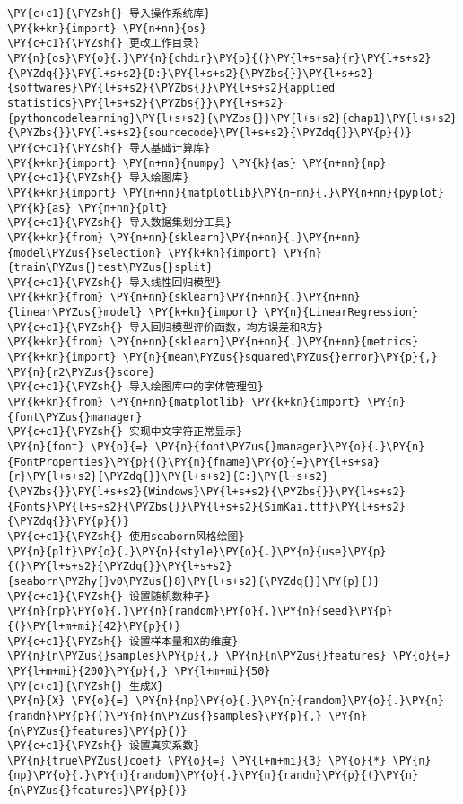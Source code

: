 \begin{Verbatim}[commandchars=\\\{\}]
\PY{c+c1}{\PYZsh{} 导入操作系统库}
\PY{k+kn}{import} \PY{n+nn}{os}
\PY{c+c1}{\PYZsh{} 更改工作目录}
\PY{n}{os}\PY{o}{.}\PY{n}{chdir}\PY{p}{(}\PY{l+s+sa}{r}\PY{l+s+s2}{\PYZdq{}}\PY{l+s+s2}{D:}\PY{l+s+s2}{\PYZbs{}}\PY{l+s+s2}{softwares}\PY{l+s+s2}{\PYZbs{}}\PY{l+s+s2}{applied statistics}\PY{l+s+s2}{\PYZbs{}}\PY{l+s+s2}{pythoncodelearning}\PY{l+s+s2}{\PYZbs{}}\PY{l+s+s2}{chap1}\PY{l+s+s2}{\PYZbs{}}\PY{l+s+s2}{sourcecode}\PY{l+s+s2}{\PYZdq{}}\PY{p}{)}
\PY{c+c1}{\PYZsh{} 导入基础计算库}
\PY{k+kn}{import} \PY{n+nn}{numpy} \PY{k}{as} \PY{n+nn}{np}
\PY{c+c1}{\PYZsh{} 导入绘图库}
\PY{k+kn}{import} \PY{n+nn}{matplotlib}\PY{n+nn}{.}\PY{n+nn}{pyplot} \PY{k}{as} \PY{n+nn}{plt}
\PY{c+c1}{\PYZsh{} 导入数据集划分工具}
\PY{k+kn}{from} \PY{n+nn}{sklearn}\PY{n+nn}{.}\PY{n+nn}{model\PYZus{}selection} \PY{k+kn}{import} \PY{n}{train\PYZus{}test\PYZus{}split}
\PY{c+c1}{\PYZsh{} 导入线性回归模型}
\PY{k+kn}{from} \PY{n+nn}{sklearn}\PY{n+nn}{.}\PY{n+nn}{linear\PYZus{}model} \PY{k+kn}{import} \PY{n}{LinearRegression}
\PY{c+c1}{\PYZsh{} 导入回归模型评价函数，均方误差和R方}
\PY{k+kn}{from} \PY{n+nn}{sklearn}\PY{n+nn}{.}\PY{n+nn}{metrics} \PY{k+kn}{import} \PY{n}{mean\PYZus{}squared\PYZus{}error}\PY{p}{,} \PY{n}{r2\PYZus{}score}
\PY{c+c1}{\PYZsh{} 导入绘图库中的字体管理包}
\PY{k+kn}{from} \PY{n+nn}{matplotlib} \PY{k+kn}{import} \PY{n}{font\PYZus{}manager}
\PY{c+c1}{\PYZsh{} 实现中文字符正常显示}
\PY{n}{font} \PY{o}{=} \PY{n}{font\PYZus{}manager}\PY{o}{.}\PY{n}{FontProperties}\PY{p}{(}\PY{n}{fname}\PY{o}{=}\PY{l+s+sa}{r}\PY{l+s+s2}{\PYZdq{}}\PY{l+s+s2}{C:}\PY{l+s+s2}{\PYZbs{}}\PY{l+s+s2}{Windows}\PY{l+s+s2}{\PYZbs{}}\PY{l+s+s2}{Fonts}\PY{l+s+s2}{\PYZbs{}}\PY{l+s+s2}{SimKai.ttf}\PY{l+s+s2}{\PYZdq{}}\PY{p}{)}
\PY{c+c1}{\PYZsh{} 使用seaborn风格绘图}
\PY{n}{plt}\PY{o}{.}\PY{n}{style}\PY{o}{.}\PY{n}{use}\PY{p}{(}\PY{l+s+s2}{\PYZdq{}}\PY{l+s+s2}{seaborn\PYZhy{}v0\PYZus{}8}\PY{l+s+s2}{\PYZdq{}}\PY{p}{)}
\PY{c+c1}{\PYZsh{} 设置随机数种子}
\PY{n}{np}\PY{o}{.}\PY{n}{random}\PY{o}{.}\PY{n}{seed}\PY{p}{(}\PY{l+m+mi}{42}\PY{p}{)}
\PY{c+c1}{\PYZsh{} 设置样本量和X的维度}
\PY{n}{n\PYZus{}samples}\PY{p}{,} \PY{n}{n\PYZus{}features} \PY{o}{=} \PY{l+m+mi}{200}\PY{p}{,} \PY{l+m+mi}{50}
\PY{c+c1}{\PYZsh{} 生成X}
\PY{n}{X} \PY{o}{=} \PY{n}{np}\PY{o}{.}\PY{n}{random}\PY{o}{.}\PY{n}{randn}\PY{p}{(}\PY{n}{n\PYZus{}samples}\PY{p}{,} \PY{n}{n\PYZus{}features}\PY{p}{)}
\PY{c+c1}{\PYZsh{} 设置真实系数}
\PY{n}{true\PYZus{}coef} \PY{o}{=} \PY{l+m+mi}{3} \PY{o}{*} \PY{n}{np}\PY{o}{.}\PY{n}{random}\PY{o}{.}\PY{n}{randn}\PY{p}{(}\PY{n}{n\PYZus{}features}\PY{p}{)}

\end{Verbatim}
